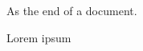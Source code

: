 \documentclass{article}
\begin{document}
{As the end of a document.}

Lorem ipsum \clozelinefil{}
\end{document}
